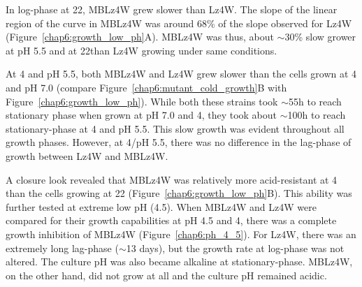 In log-phase at 22\dg{}, MBLz4W grew slower than Lz4W\@. The slope
of the linear region of the curve in MBLz4W was around 68\% of the
slope observed for Lz4W (Figure~\ref{chap6:growth_low_ph}A).
MBLz4W was thus, about $\sim$30\% slow grower at pH 5.5 and at
22\dg{}\@ than Lz4W growing under same conditions.

At 4\dg{} and pH 5.5, both MBLz4W and Lz4W grew slower than the
cells grown at 4\dg{} and pH 7.0 (compare
Figure~\ref{chap6:mutant_cold_growth}B with
Figure~\ref{chap6:growth_low_ph}). While both these strains took
\U{$\sim$55}{h} to reach stationary phase when grown at pH 7.0 and
4\dg{}, they took about \U{$\sim$100}{h} to reach stationary-phase
at 4\dg{} and pH 5.5. This slow growth was evident throughout all
growth phases. However, at 4\dg{}/pH 5.5, there was no difference
in the lag-phase of growth between Lz4W and MBLz4W.

%

A closure look revealed  that MBLz4W was relatively more
acid-resistant at 4\dg{} than the cells growing at 22\dg{}
(Figure~\ref{chap6:growth_low_ph}B). This ability was further
tested at extreme low pH (4.5). When MBLz4W and Lz4W were compared
for their growth capabilities at pH 4.5 and 4\dg{}, there was a
complete growth inhibition of MBLz4W (Figure~\ref{chap6:ph_4_5}).
For Lz4W, there was an extremely long lag-phase ($\sim$13 days),
but the growth rate at log-phase was not altered. The culture pH
was also became alkaline at stationary-phase. MBLz4W, on the other
hand, did not grow at all and the culture pH remained acidic.

